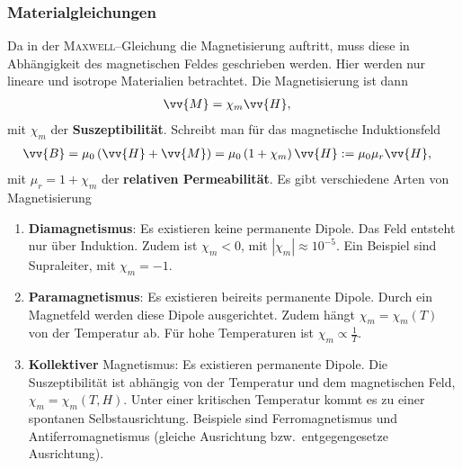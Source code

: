 \documentclass[a4paper,12pt]{article}
\numberwithin{equation}{section}
\begin{document}
\subsubsection{Materialgleichungen}
Da in der \textsc{Maxwell}--Gleichung die Magnetisierung auftritt, muss diese in Abhängigkeit des magnetischen Feldes geschrieben werden. Hier werden nur lineare und isotrope Materialien betrachtet. Die Magnetisierung ist dann
\begin{align} 
        \vv{M}&=\chi_m \vv{H}
,\end{align} 
mit $\chi_m$ der \textbf{Suszeptibilität}. Schreibt man für das magnetische Induktionsfeld
\begin{align} 
        \vv{B}&=\mu _0\left(\vv{H}+\vv{M}\right)=\mu _0\left(1+\chi_m\right)\vv{H}:=\mu _0\mu _r\vv{H}
,\end{align} 
mit $\mu _r=1+\chi_m$ der \textbf{relativen Permeabilität}. Es gibt verschiedene Arten von Magnetisierung
\begin{enumerate}[label=\roman*)]
        \item \textbf{Diamagnetismus}: Es existieren keine permanente Dipole. Das Feld entsteht nur über Induktion. Zudem ist $\chi_m<0$, mit $|\chi_m|\approx 10^{-5}$. Ein Beispiel sind Supraleiter, mit $\chi_m=-1$.
        \item \textbf{Paramagnetismus}: Es existieren beireits permanente Dipole. Durch ein Magnetfeld werden diese Dipole ausgerichtet. Zudem hängt $\chi_m=\chi_m\left(T\right)$ von der Temperatur ab. Für hohe Temperaturen ist $\chi_m\propto \tfrac{1}{T}$.
        \item \textbf{Kollektiver} Magnetismus: Es existieren permanente Dipole. Die Suszeptibilität ist abhängig von der Temperatur und dem magnetischen Feld, $\chi_m=\chi_m\left(T,H\right)$. Unter einer kritischen Temperatur kommt es zu einer spontanen Selbstausrichtung. Beispiele sind Ferromagnetismus und Antiferromagnetismus (gleiche Ausrichtung bzw.\ entgegengesetze Ausrichtung).
\end{enumerate}
\end{document}
